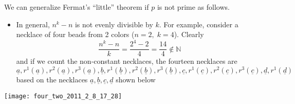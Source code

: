 \documentclass[english]{article}
\begin{document}
We can generalize Fermat's {}``little'' theorem if $p$ is not prime
as follows. 
\begin{itemize}
\item In general, $n^{k}-n$ is not evenly divisible by $k$. For example,
consider a necklace of four beads from 2 colors ($n=2,\; k=4$). Clearly\[
\frac{n^{k}-n}{k}=\frac{2^{4}-2}{4}=\frac{14}{4}\notin\mathbb{N}\]
and if we count the non-constant necklaces, the fourteen necklaces
are\[
\underline{a},r^{1}\left(\underline{a}\right),r^{2}\left(\underline{a}\right),r^{3}\left(\underline{a}\right),\underline{b},r^{1}\left(\underline{b}\right),r^{2}\left(\underline{b}\right),r^{3}\left(\underline{b}\right),\underline{c},r^{1}\left(\underline{c}\right),r^{2}\left(\underline{c}\right),r^{3}\left(\underline{c}\right),\underline{d},r^{1}\left(\underline{d}\right)\]
based on the necklaces $\underline{a},\underline{b},\underline{c},\underline{d}$
shown below
\end{itemize}
\begin{center}
\texttt{[image: four\_two\_2011\_2\_8\_17\_28]}
\par\end{center}
\end{document}
